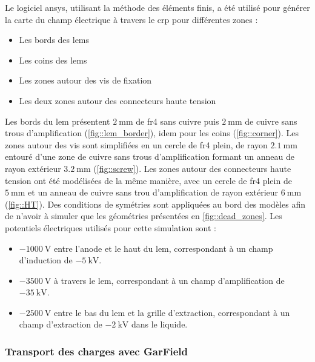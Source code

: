        Le logiciel \gls{ansys}, utilisant la méthode des éléments finis, a été utilisé pour générer la carte du champ électrique à travers le \gls{crp} pour différentes zones :
        \begin{itemize}
          \item Les bords des \glspl{lem}
          \item Les coins des \glspl{lem}
          \item Les zones autour des vis de fixation
          \item Les deux zones autour des connecteurs haute tension
        \end{itemize}
        Les bords du \gls{lem} présentent $\SI{2}{\milli\meter}$ de \gls{fr4} sans cuivre puis $\SI{2}{\milli\meter}$ de cuivre sans trous d'amplification (\autoref{fig::lem_border}), idem pour les coins (\autoref{fig::corner}). Les zones autour des vis sont simplifiées en un cercle de \gls{fr4} plein, de rayon $\SI{2.1}{\milli\meter}$ entouré d'une zone de cuivre sans trous d'amplification formant un anneau de rayon extérieur $\SI{3.2}{\milli\meter}$ (\autoref{fig::screw}). Les zones autour des connecteurs haute tension ont été modélisées de la même manière, avec un cercle de \gls{fr4} plein de $\SI{5}{\milli\meter}$ et un anneau de cuivre sans trou d'amplification de rayon extérieur $\SI{6}{\milli\meter}$ (\autoref{fig::HT}). Des conditions de symétries sont appliquées au bord des modèles afin de n'avoir à simuler que les géométries présentées en \autoref{fig::dead_zones}. 
        Les potentiels électriques utilisés pour cette simulation sont : 
        \begin{itemize}
          \item $\SI{-1000}{\volt}$ entre l'anode et le haut du \gls{lem}, correspondant à un champ d'induction de $\SI{-5}{\kilo\volt}$.
          \item $\SI{-3500}{\volt}$ à travers le \gls{lem}, correspondant à un champ d'amplification de $\SI{-35}{\kilo\volt}$.
          \item $\SI{-2500}{\volt}$ entre le bas du \gls{lem} et la grille d'extraction, correspondant à un champ d'extraction de $\SI{-2}{\kilo\volt}$ dans le liquide.
        \end{itemize}
                
      \subsubsection{Transport des charges avec GarField}
            
